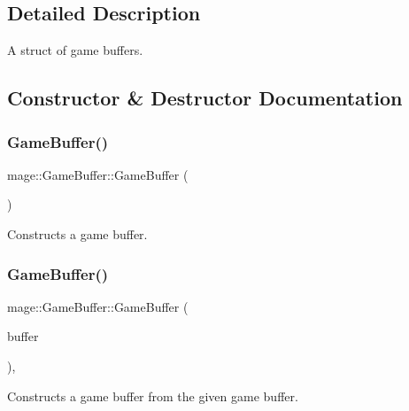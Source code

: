 \subsection{Detailed Description}
A struct of game buffers. 

\subsection{Constructor \& Destructor Documentation}
\hypertarget{structmage_1_1_game_buffer_a71c6416a3173fb5016290a622b14bd96}{}\label{structmage_1_1_game_buffer_a71c6416a3173fb5016290a622b14bd96} 
\subsubsection{\texorpdfstring{Game\+Buffer()}{GameBuffer()}\hspace{0.1cm}{\footnotesize\ttfamily [1/3]}}
{\footnotesize\ttfamily mage\+::\+Game\+Buffer\+::\+Game\+Buffer (\begin{DoxyParamCaption}{ }\end{DoxyParamCaption})\hspace{0.3cm}{\ttfamily [noexcept]}}

Constructs a game buffer. \hypertarget{structmage_1_1_game_buffer_ae8f7b5eff3fbabdb1cc44f04cfa69272}{}\label{structmage_1_1_game_buffer_ae8f7b5eff3fbabdb1cc44f04cfa69272} 
\subsubsection{\texorpdfstring{Game\+Buffer()}{GameBuffer()}\hspace{0.1cm}{\footnotesize\ttfamily [2/3]}}
{\footnotesize\ttfamily mage\+::\+Game\+Buffer\+::\+Game\+Buffer (\begin{DoxyParamCaption}\item[{const \hyperlink{structmage_1_1_game_buffer}{Game\+Buffer} \&}]{buffer }\end{DoxyParamCaption})\hspace{0.3cm}{\ttfamily [default]}, {\ttfamily [noexcept]}}

Constructs a game buffer from the given game buffer.


